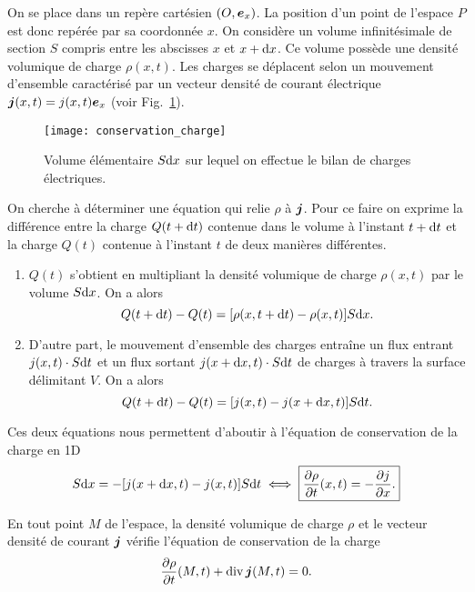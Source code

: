 On se place dans un repère cartésien $(O, \ex)$. La position d'un point 
de l'espace $P$ est donc repérée par sa coordonnée $x$. On considère un volume
infinitésimale de section $S$ compris entre les abscisses $x$ et $x + \mathrm{d}x$.
Ce volume possède une densité volumique de charge $\rho(x, t)$. Les charges se 
déplacent selon un mouvement d'ensemble caractérisé par un vecteur densité de 
courant électrique $\vecj(x, t) = j(x, t)\ex$ 
(voir Fig.~\ref{fig:conservation_charge}). 

\begin{figure}[htpb]
	\centering
	\texttt{[image: conservation\_charge]}
	\caption{Volume élémentaire $S\mathrm{d}x$ sur lequel on effectue le bilan
	de charges électriques.}
	\label{fig:conservation_charge}
\end{figure}
On cherche à déterminer une équation qui relie $\rho$ à $\vecj$. Pour ce faire
on exprime la différence entre la charge $Q(t + \mathrm{d}t)$ contenue dans le volume
à l'instant $t + \mathrm{d}t$ et la charge $Q(t)$ contenue à l'instant $t$ de deux manières
différentes.

\begin{enumerate}
	\item $Q(t)$ s'obtient en multipliant la densité volumique de charge $\rho(x, t)$
	par le volume $S \mathrm{d}x$. On a alors 
	\begin{equation*}
		Q(t + \mathrm{d}t) - Q(t) = [\rho(x, t + \mathrm{d}t) - \rho(x, t)] S\mathrm{d}x.
	\end{equation*}

	\item D'autre part, le mouvement d'ensemble des charges entraîne un 
	  flux entrant $j(x, t) \cdot S \mathrm{d}t$ et un flux sortant 
	  $j(x + \mathrm{d}x, t) \cdot S \mathrm{d}t$ de charges à travers la
	  surface délimitant $V$. On a alors
	  \begin{equation*}
		  Q(t + \mathrm{d}t) - Q(t) = [j(x, t) - j(x + \mathrm{d}x, t)]S \mathrm{d}t.
	  \end{equation*}
\end{enumerate}
Ces deux équations nous permettent d'aboutir à l'équation de conservation de la
charge en 1D
\begin{equation*}
	[\rho(x, t + \dt) - \rho(x, t)] S \dx = -[j(x + \dx, t) - j(x, t)] S \dt
	\iff \boxed{\dd{\rho}{t}(x, t) = - \dd{j}{x}.}
\end{equation*}

\begin{defn}
	En tout point $M$ de l'espace, la densité volumique de charge $\rho$
	et le vecteur densité de courant $\vecj$ 
	vérifie l'équation de conservation de la charge
	\begin{equation*}
		\dd{\rho}{t}(M, t) + \div \vecj(M, t) = 0.
	\end{equation*}
\end{defn}


